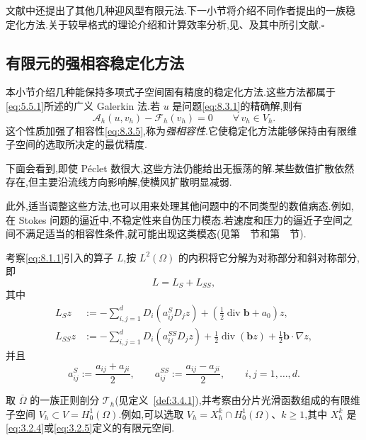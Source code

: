 \begin{note}
文献中还提出了其他几种迎风型有限元法.下一小节将介绍不同作者提出的一族稳定化方法.关于较早格式的理论介绍和计算效率分析,见、及其中所引文献.\hfill\(\square\)
\end{note}

\subsection{有限元的强相容稳定化方法}\label{sec:8.3.2}

本小节介绍几种能保持多项式子空间固有精度的稳定化方法.这些方法都属于\eqref{eq:5.5.1}所述的广义 Galerkin 法.若 \(u\) 是问题\eqref{eq:8.3.1}的精确解,则有
\begin{equation}\label{eq:8.3.6}
  \mathcal A_h(u,v_h)-\mathcal F_h(v_h)=0\qquad\forall\,v_h\in V_h.
\end{equation}
这个性质加强了相容性\eqref{eq:8.3.5},称为\emph{强相容性}.它使稳定化方法能够保持由有限维子空间的选取所决定的最优精度.

下面会看到,即使 Péclet 数很大,这些方法仍能给出无振荡的解.某些数值扩散依然存在,但主要沿流线方向影响解,使横风扩散明显减弱.

此外,适当调整这些方法,也可以用来处理其他问题中的不同类型的数值病态.例如,在 Stokes 问题的逼近中,不稳定性来自伪压力模态.若速度和压力的逼近子空间之间不满足适当的相容性条件,就可能出现这类模态(见第~~节和第~~节).

考察\eqref{eq:8.1.1}引入的算子 \(L\),按 \(L^2(\Omega)\) 的内积将它分解为对称部分和斜对称部分,即
\begin{equation}\label{eq:8.3.7}
  L=L_S+L_{SS},
\end{equation}
其中
\begin{align}
  L_S z&:=-\sum_{i,j=1}^d D_i(a_{ij}^S D_jz)
              +\left(\frac12\operatorname{div}\boldsymbol{b}+a_0\right)z,\label{eq:8.3.8}\\
  L_{SS} z&:=-\sum_{i,j=1}^d D_i(a_{ij}^{SS}D_jz)
        +\frac12\operatorname{div}(\boldsymbol{b}z)+\frac12\boldsymbol{b}\cdot\nabla z,\label{eq:8.3.9}
\end{align}
并且
\begin{equation}\label{eq:8.3.10}
  a_{ij}^S:=\frac{a_{ij}+a_{ji}}2,\qquad
  a_{ij}^{SS}:=\frac{a_{ij}-a_{ji}}2,\qquad i,j=1,\ldots,d.
\end{equation}

取 \(\overline\Omega\) 的一族正则剖分 \(\mathcal T_h\)(见定义~\ref{def:3.4.1}),并考察由分片光滑函数组成的有限维子空间 \(V_h\subset V=H_0^1(\Omega)\).例如,可以选取 \(V_h=X_h^k\cap H_0^1(\Omega)\)、\(k\ge1\),其中 \(X_h^k\) 是\eqref{eq:3.2.4}或\eqref{eq:3.2.5}定义的有限元空间.

